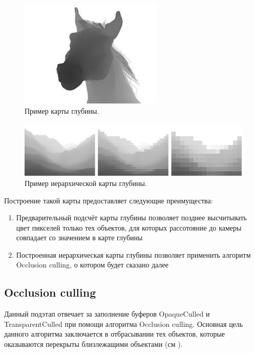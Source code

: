 		\begin{figure}[ht!] 
			\center
			\includegraphics [scale=1] {my_folder/images//depth_map}	
			\caption{Пример карты глубины.} 
			\label{fig:depth_map}
		\end{figure}
		
		\begin{figure}[ht!] 
			\center
			\includegraphics [scale=1] {my_folder/images//hier_depth_map}	
			\caption{Пример иерархической карты глубины.} 
			\label{fig:hier_depth_map}
		\end{figure}
		\FloatBarrier
		Построение такой карты предоставляет следующие преимущества:
		\begin{enumerate}[1.]
			\item Предварительный подсчёт карты глубины позволяет позднее высчитывать цвет пикселей только тех объектов, для которых рассотояние до камеры совпадает со значением в карте глубины
			\item Построенная иерархическая карты глубины позволяет применить алгоритм Occlusion culling, о котором будет сказано далее
		\end{enumerate}
	\subsection{Occlusion culling} \label{ch3:pre_pass:occlusion}
		Данный подэтап отвечает за заполнение буферов OpaqueCulled и  TransparentCulled при помощи алгоритма Occlusion culling\cite{greene1993hierarchical}. Основная цель данного алгоритма заключается в отбрасывании тех объектов, которые оказываются перекрыты близлежащими объектами (см ). 
		
